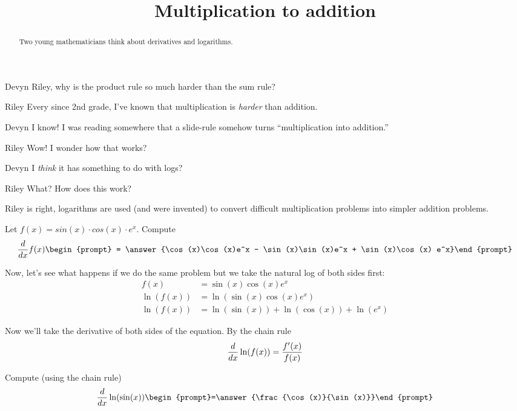 \documentclass{ximera}
\title[Break-Ground:]{Multiplication to addition}
\begin{document}
\begin{abstract}
Two young mathematicians think about derivatives and logarithms.
\end{abstract}
\maketitle

\begin{dialogue}
\item[Devyn] Riley, why is the product rule so much harder than the sum rule?
\item[Riley] Every since 2nd grade, I've known that multiplication is
  \textit{harder} than addition.
\item[Devyn] I know! I was reading somewhere that a slide-rule somehow
  turns ``multiplication into addition.''
\item[Riley] Wow! I wonder how that works?
\item[Devyn] I \textit{think} it has something to do with logs?
\item[Riley] What? How does this work?
\end{dialogue}

Riley is right, logarithms are used (and were invented) to convert
difficult multiplication problems into simpler addition problems.

\begin{problem}
  Let $f(x) = sin(x) \cdot cos(x) \cdot e^x$. Compute
  \[
  \ddx f(x)\begin{prompt} = \answer{\cos(x)\cos(x)e^x - \sin(x)\sin(x)e^x + \sin(x)\cos(x) e^x}\end{prompt}
  \]
\end{problem}

Now, let's see what happens if we do the same problem but we take the
natural log of both sides first:
\begin{align*}
  f(x) &= \sin(x)\cos(x)e^x\\
  \ln(f(x)) &= \ln(\sin(x)\cos(x)e^x)\\
  \ln(f(x)) &=\ln(\sin(x)) + \ln(\cos(x)) + \ln(e^x)
\end{align*}

Now we'll take the derivative of both sides of the equation.
By the chain rule
\[
\frac{d}{dx} \ln(f(x))= \frac{f'(x)}{f(x)}
\]


\begin{problem}
  Compute (using the chain rule)
  \[
  \ddx \ln(\sin(x))  \begin{prompt}=\answer{\frac{\cos(x)}{\sin(x)}}\end{prompt}
  \]
\end{problem}
\end{document}
